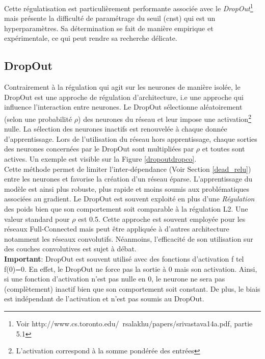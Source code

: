 \noindent Cette régulatisation est particulièrement performante associée avec le \textit{DropOut}\footnote{Voir http://www.cs.toronto.edu/~rsalakhu/papers/srivastava14a.pdf, partie 5.1} mais présente la difficulté de paramétrage du seuil (cnst) qui est un hyperparamètres. Sa détermination se fait de manière empirique et expérimentale, ce qui peut rendre sa recherche délicate.

\subsection{DropOut}

Contrairement à la régulation qui agit sur les neurones de manière isolée, le DropOut\cite{dropout_deep} est une approche de régulation d'architecture, i.e une approche qui influence l'interaction entre neurones. Le DropOut sélectionne aléatoirement (selon une probabilité $\rho$) des neurones du réseau et leur impose une activation\footnote{L'activation correspond à la somme pondérée des entrées} nulle. La sélection des neurones inactifs est renouvelée à chaque donnée d'apprentissage. Lors de l'utilisation du réseau hors apprentissage, chaque sorties des neurones concernées par le DropOut sont multipliées par $\rho$ et toutes sont actives. Un exemple est visible sur la Figure \ref{dropoutdropco}.\\

\noindent Cette méthode permet de limiter l'inter-dépendance (Voir Section \ref{dead_relu}) entre les neurones et favorise la création d'un réseau éparse. L'apprentissage du modèle est ainsi plus robuste, plus rapide et moins soumis aux problématiques associées au gradient. Le DropOut est souvent exploité en plus d'une \textit{Régulation} des poids bien que son comportement soit comparable à la régulation L2. Une valeur standard pour $\rho$ est 0.5. Cette approche est souvent employée pour les réseaux Full-Connected mais peut être appliquée à d'autres architecture notamment les réseaux convolutifs. Néanmoins, l'efficacité de son utilisation sur des couches convolutives est sujet à débat.\\

\noindent \textbf{Important}: DropOut est souvent utilisé avec des fonctions d'activation f tel f(0)=0. En effet, le DropOut ne force pas la sortie à 0 mais son activation. Ainsi, si une fonction d'activation n'est pas nulle en 0, le neurone ne sera pas (complètement) inactif bien que son comportement soit constant. De plus, le biais est indépendant de l'activation et n'est pas soumis au DropOut.

